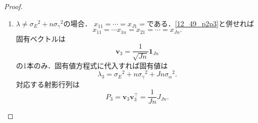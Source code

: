 \begin{proof}
\begin{enumerate}
\begin{enumerate}
\[      \begin{pmatrix}
        x_{11} \\ \vdots \\ x_{J1}
      \end{pmatrix}
      = \boldsymbol{w}_2^{(l)}
      = \begin{pmatrix}
        1 \\ \vdots \\ 1 \\ -l \\ 0 \\ \vdots \\ 0
      \end{pmatrix}
       \quad (l = 1, \dots, J-1)
      \]
      が取れる．よって，もとの\(Jn\)次元での正規直交系としては\(\dim = J-1\)の
      \[
      \begin{pmatrix}
        x_{11} \\ \vdots \\ x_{Jn}
      \end{pmatrix}
      = \boldsymbol{v}_2^{(l)}
      = \frac{1}{\sqrt{l(l+1)n}} \boldsymbol{w}_2^{(l)} \otimes \boldsymbol{1}_n
      \quad (k = 1, \dots, J-1)
      \]
      が取れる．よって\(\lambda_2\)に対応する射影行列は
      \begin{align*}
        P_2
        &= \sum_{l=1}^{J-1} \boldsymbol{v}_2^{(l)} (\boldsymbol{v}_2^{(l)})^\top
        = \sum_{l=1}^{J-1} \frac{1}{l(l+1)n} (\boldsymbol{w}_2^{(l)} \otimes \boldsymbol{1}_n) (\boldsymbol{w}_2^{(l)} \otimes \boldsymbol{1}_n)^\top \\
        &= \sum_{l=1}^{J-1} \frac{1}{l(l+1)n} (\boldsymbol{w}_2^{(l)} \otimes \boldsymbol{1}_n) ((\boldsymbol{w}_2^{(l)})^\top \otimes \boldsymbol{1}_n^\top) \\
        &= \frac{1}{n} \sum_{l=1}^{J-1} \frac{1}{l(l+1)} (\boldsymbol{w}_2^{(l)} (\boldsymbol{w}_2^{(l)})^\top) \otimes (\boldsymbol{1}_n \boldsymbol{1}_n^\top) \\
        &= \frac{1}{n} \left( I_J - \frac{1}{J} J_J \right) \otimes J_n .
      \end{align*}
      最後の計算は帰納法により容易に示せる．

      \item \(\lambda \neq \sigma_E{}^2 + n \sigma_\gamma{}^2\)の場合．
      \(x_{11} = \cdots = x_{J1} =\)である．\eqref{12_49_p2p3}と併せれば
      \[ x_{11} = \cdots x_{1n} = x_{21} = \cdots = x_{Jn} . \]
      固有ベクトルは
      \[ \boldsymbol{v}_3 = \frac{1}{\sqrt{Jn}} \boldsymbol{1}_{Jn} \]
      の1本のみ．固有値方程式に代入すれば固有値は
      \[ \lambda_3 =  \sigma_E{}^2 + n \sigma_\gamma{}^2 + Jn \sigma_\alpha{}^2 . \]
      対応する射影行列は
      \[ P_3 = \boldsymbol{v}_3 \boldsymbol{v}_3^\top = \frac{1}{Jn} J_{Jn} . \]
    \end{enumerate}
  \end{enumerate}
\end{proof}

